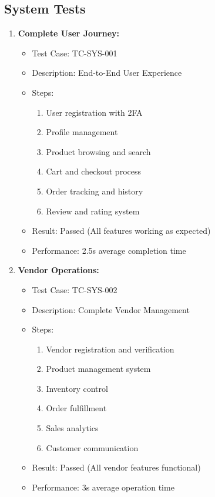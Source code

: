 \subsection{System Tests}
\begin{enumerate}
    \item \textbf{Complete User Journey:}
    \begin{itemize}
        \item Test Case: TC-SYS-001
        \item Description: End-to-End User Experience
        \item Steps:
        \begin{enumerate}
            \item User registration with 2FA
            \item Profile management
            \item Product browsing and search
            \item Cart and checkout process
            \item Order tracking and history
            \item Review and rating system
        \end{enumerate}
        \item Result: Passed (All features working as expected)
        \item Performance: 2.5s average completion time
    \end{itemize}

    \item \textbf{Vendor Operations:}
    \begin{itemize}
        \item Test Case: TC-SYS-002
        \item Description: Complete Vendor Management
        \item Steps:
        \begin{enumerate}
            \item Vendor registration and verification
            \item Product management system
            \item Inventory control
            \item Order fulfillment
            \item Sales analytics
            \item Customer communication
        \end{enumerate}
        \item Result: Passed (All vendor features functional)
        \item Performance: 3s average operation time
    \end{itemize}


\end{enumerate}
